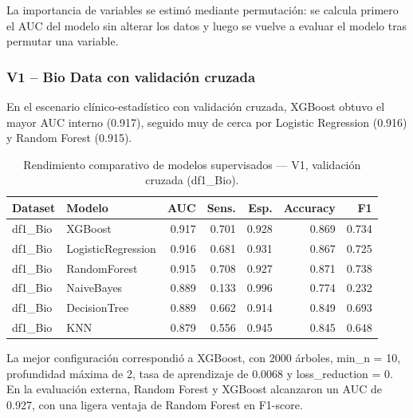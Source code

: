 La importancia de variables se estimó mediante permutación: se calcula primero
el AUC del modelo sin alterar los datos y luego se vuelve a evaluar el modelo
tras permutar una variable.

\subsubsection{V1 -- Bio Data con validación cruzada}

En el escenario clínico-estadístico con validación cruzada, XGBoost obtuvo el
mayor AUC interno (0.917), seguido muy de cerca por Logistic Regression (0.916)
y Random Forest (0.915).

\begin{table}[H]
  \centering
  \caption[V1 CV validación]{Rendimiento comparativo de modelos supervisados --- V1, validación cruzada (df1\_Bio).}
  \label{tab:v1-cv-base}
  \scriptsize
  \begin{tabular}{llrrrrr}
    \toprule
    \textbf{Dataset} & \textbf{Modelo} & \textbf{AUC} & \textbf{Sens.} & \textbf{Esp.} & \textbf{Accuracy} & \textbf{F1} \\
    \midrule
    df1\_Bio & XGBoost            & 0.917 & 0.701 & 0.928 & 0.869 & 0.734 \\
    df1\_Bio & LogisticRegression & 0.916 & 0.681 & 0.931 & 0.867 & 0.725 \\
    df1\_Bio & RandomForest       & 0.915 & 0.708 & 0.927 & 0.871 & 0.738 \\
    df1\_Bio & NaiveBayes         & 0.889 & 0.133 & 0.996 & 0.774 & 0.232 \\
    df1\_Bio & DecisionTree       & 0.889 & 0.662 & 0.914 & 0.849 & 0.693 \\
    df1\_Bio & KNN                & 0.879 & 0.556 & 0.945 & 0.845 & 0.648 \\
    \bottomrule
  \end{tabular}
\end{table}

La mejor configuración correspondió a XGBoost, con 2000 árboles, min\_n = 10,
profundidad máxima de 2, tasa de aprendizaje de 0.0068 y loss\_reduction = 0.
En la evaluación externa, Random Forest y XGBoost alcanzaron un AUC de 0.927,
con una ligera ventaja de Random Forest en F1-score.


